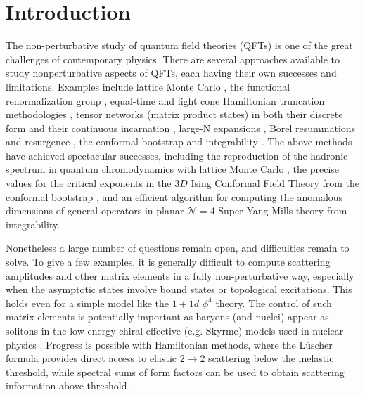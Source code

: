 \documentclass[twocolumn,secnumarabic,amssymb, nobibnotes, aps, prd]{revtex4-2}
\begin{document}
\section{Introduction}
The non-perturbative study of quantum field theories (QFTs) is one of the great challenges of contemporary physics.
There are several approaches available to study nonperturbative aspects of QFTs, each having their own successes and limitations. Examples include lattice Monte Carlo \cite{Wilson:1974sk,Durr:2008zz}, the functional renormalization group \cite{Wetterich:1992yh,Morris:1993qb}, equal-time \cite{yurov1990truncated,James:2017cpc} and light cone Hamiltonian truncation methodologies \cite{Katz:2016hxp,anand2020introduction,https://doi.org/10.48550/arxiv.2209.14306},  tensor networks (matrix product states) in both their discrete form \cite{Milsted:2013rxa,Banuls:2013jaa,Kadoh:2018tis} and their continuous incarnation \cite{Verstraete:2010ft,Tilloy:2021yre,Tilloy:2021hhb,https://doi.org/10.48550/arxiv.2209.05341}, large-N expansions \cite{tHooft:1973alw}, Borel resummations and resurgence \cite{Serone:2018gjo,Serone:2019szm,Sberveglieri:2020eko,Abbott:2020qnl,Bajnok:2021dri}, the conformal bootstrap \cite{Belavin:1984vu, Rattazzi:2008pe, El-Showk:2014dwa} and integrability \cite{Karowski:1977th, Zamolodchikov:1978xm, Beisert:2010jr}.
The above methods have achieved spectacular successes, including the reproduction of the hadronic spectrum in quantum chromodynamics with lattice Monte Carlo \cite{Durr:2008zz}, the precise values for the critical exponents in the $3D$ Ising Conformal Field Theory from the conformal bootstrap \cite{El-Showk:2014dwa}, and an efficient algorithm for computing the anomalous dimensions of general operators in planar $\mathcal{N}=4$ Super Yang-Mills theory from integrability.

Nonetheless a large number of questions remain open, and difficulties remain to solve.  
To give a few examples, it is generally difficult to compute scattering amplitudes and other matrix elements in a fully non-perturbative way, especially when the asymptotic states involve bound states or topological excitations. This holds even for a simple model like the $1+1d$ $\phi^4$ theory. The control of such matrix elements is potentially important as baryons (and nuclei) appear as solitons in the low-energy chiral effective (e.g. Skyrme) models used in nuclear physics \cite{Skyrme:1961vq,Weinberg:1978kz,Witten:1983tx}. Progress is possible with Hamiltonian methods, where the L\"uscher formula provides direct access to elastic $2\rightarrow 2$ scattering below the inelastic threshold, while spectral sums of form factors can be used to obtain scattering information above threshold \cite{Henning:2022xlj}.
 
\end{document}
